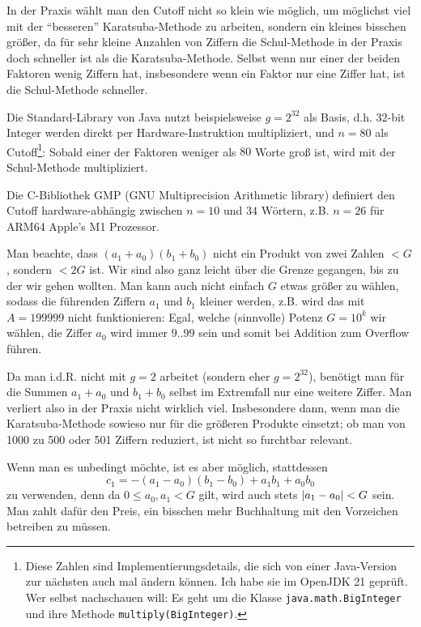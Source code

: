 \begin{remark}
In der Praxis wählt man den Cutoff nicht so klein wie möglich, um möglichst viel mit der \enquote{besseren} Karatsuba-Methode zu arbeiten, sondern ein kleines bisschen größer, da für sehr kleine Anzahlen von Ziffern die Schul-Methode in der Praxis doch schneller ist als die Karatsuba-Methode. Selbst wenn nur einer der beiden Faktoren wenig Ziffern hat, insbesondere wenn ein Faktor nur eine Ziffer hat, ist die Schul-Methode schneller.

\smallskip
Die Standard-Library von Java nutzt beispielsweise $g=2^{32}$ als Basis, d.h. 32-bit Integer werden direkt per Hardware-Instruktion multipliziert, und $n=80$ als Cutoff\footnote{Diese Zahlen sind Implementierungsdetails, die sich von einer Java-Version zur nächsten auch mal ändern können. Ich habe sie im OpenJDK 21 geprüft. Wer selbst nachschauen will: Es geht um die Klasse \texttt{java.math.BigInteger} und ihre Methode \texttt{multiply(BigInteger)}.}: Sobald einer der Faktoren weniger als $80$ Worte groß ist, wird mit der Schul-Methode multipliziert.

Die C-Bibliothek GMP (GNU Multiprecision Arithmetic library) definiert den Cutoff hardware-abhängig zwischen $n=10$ und $34$ Wörtern, z.B. $n=26$ für ARM64 Apple's M1 Prozessor.
\end{remark}

\begin{remark}
Man beachte, dass $(a_1+a_0)(b_1+b_0)$ nicht ein Produkt von zwei Zahlen $<G$, sondern $<2G$ ist. Wir sind also ganz leicht über die Grenze gegangen, bis zu der wir gehen wollten. Man kann auch nicht einfach $G$ etwas größer zu wählen, sodass die führenden Ziffern $a_1$ und $b_1$ kleiner werden, z.B. wird das mit $A=199999$ nicht funktionieren: Egal, welche (sinnvolle) Potenz $G=10^k$ wir wählen, die Ziffer $a_0$ wird immer $9..99$ sein und somit bei Addition zum Overflow führen.

\smallskip
Da man i.d.R. nicht mit $g=2$ arbeitet (sondern eher $g=2^{32}$), benötigt man für die Summen $a_1+a_0$ und $b_1+b_0$ selbst im Extremfall nur eine weitere Ziffer. Man verliert also in der Praxis nicht wirklich viel. Insbesondere dann, wenn man die Karatsuba-Methode sowieso nur für die größeren Produkte einsetzt; ob man von 1000 zu 500 oder 501 Ziffern reduziert, ist nicht so furchtbar relevant.

\medskip
Wenn man es unbedingt möchte, ist es aber möglich, stattdessen
\[c_1=-(a_1-a_0)(b_1-b_0)+a_1 b_1+a_0 b_0\]
zu verwenden, denn da $0\leq a_0,a_1<G$ gilt, wird auch stets $\lvert a_1-a_0\rvert<G$ sein. Man zahlt dafür den Preis, ein bisschen mehr Buchhaltung mit den Vorzeichen betreiben zu müssen.
\end{remark}

